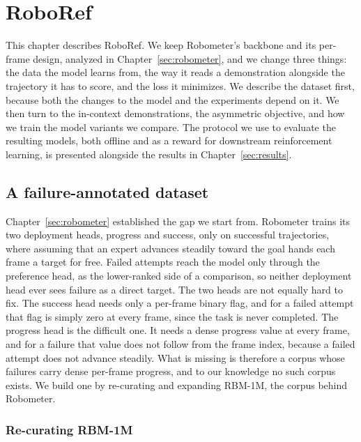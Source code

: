 \chapter{RoboRef}
\label{sec:methodology}


This chapter describes RoboRef. We keep Robometer's backbone and its per-frame design, analyzed in Chapter~\ref{sec:robometer}, and we change three things: the data the model learns from, the way it reads a demonstration alongside the trajectory it has to score, and the loss it minimizes. We describe the dataset first, because both the changes to the model and the experiments depend on it. We then turn to the in-context demonstrations, the asymmetric objective, and how we train the model variants we compare. The protocol we use to evaluate the resulting models, both offline and as a reward for downstream reinforcement learning, is presented alongside the results in Chapter~\ref{sec:results}.

\section{A failure-annotated dataset}
\label{sec:method-dataset}

Chapter~\ref{sec:robometer} established the gap we start from. Robometer trains its two deployment heads, progress and success, only on successful trajectories, where assuming that an expert advances steadily toward the goal hands each frame a target for free. Failed attempts reach the model only through the preference head, as the lower-ranked side of a comparison, so neither deployment head ever sees failure as a direct target. The two heads are not equally hard to fix. The success head needs only a per-frame binary flag, and for a failed attempt that flag is simply zero at every frame, since the task is never completed. The progress head is the difficult one. It needs a dense progress value at every frame, and for a failure that value does not follow from the frame index, because a failed attempt does not advance steadily. What is missing is therefore a corpus whose failures carry dense per-frame progress, and to our knowledge no such corpus exists. We build one by re-curating and expanding RBM-1M, the corpus behind Robometer.

\subsection{Re-curating RBM-1M}

